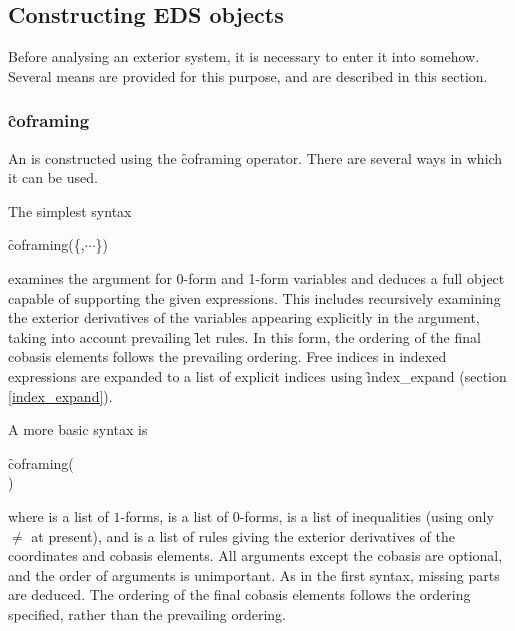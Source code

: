 
\subsection{Constructing EDS objects}
\label{Constructing EDS objects}

Before analysing an exterior system, it is necessary to enter it into 
somehow. Several means are provided for this purpose, and are described in
this section.

\subsubsection{\f{coframing}}
\label{coframing}

\hypertarget{operator:COFRAMING}{}
An   is constructed using the \f{coframing}
operator. There are several ways in which it can be used.

The simplest syntax
\begin{syntax}
	\f{coframing}(\{,$\cdots$\})
\end{syntax}
examines the argument for 0-form and 1-form variables and deduces a full
 object capable of supporting the given expressions. This
includes recursively examining the exterior derivatives of the variables
appearing explicitly in the argument, taking into account prevailing
\f{let} rules. In this form, the ordering of the final cobasis elements
follows the prevailing \REDUCE ordering. Free indices in indexed expressions
are expanded to a list of explicit indices using \f{index\_expand} (section
\ref{index_expand}).

A more basic syntax is
\begin{syntax}
	\f{coframing}(
	\\\phantom \qquad\qquad\quad
	)
\end{syntax}
where  is a list of  $1$-forms,
 is a list of  $0$-forms,
 is a list of inequalities (using only $\neq$ at
present), and  is a list of rules giving the
exterior derivatives of the coordinates and cobasis elements. All
arguments except the cobasis are optional, and the order of arguments is
unimportant. As in the first syntax, missing parts are deduced. The
ordering of the final cobasis elements follows the ordering specified,
rather than the prevailing \REDUCE ordering.

